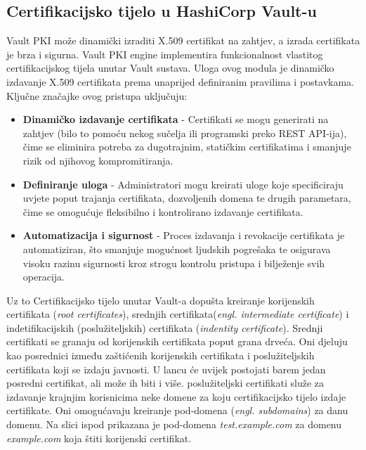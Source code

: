 \documentclass[]{foi}
\begin{document}
\subsection{Certifikacijsko tijelo u HashiCorp Vault-u}

Vault PKI može dinamički izraditi X.509 certifikat na zahtjev, a izrada certifikata je brza i sigurna. \cite{hashicorp-vault-pki-engine} Vault PKI engine implementira funkcionalnost vlastitog certifikacijskog tijela unutar Vault sustava. Uloga ovog modula je dinamičko izdavanje X.509 certifikata prema unaprijed definiranim pravilima i postavkama. Ključne značajke ovog pristupa uključuju:

\begin{itemize}
    \item \textbf{Dinamičko izdavanje certifikata} - Certifikati se mogu generirati na zahtjev (bilo to pomoću nekog sučelja ili programski preko REST API-ija), čime se eliminira potreba za dugotrajnim, statičkim certifikatima i smanjuje rizik od njihovog kompromitiranja.
    \item \textbf{Definiranje uloga} - Administratori mogu kreirati uloge koje specificiraju uvjete poput trajanja certifikata, dozvoljenih domena te drugih parametara, čime se omogućuje fleksibilno i kontrolirano izdavanje certifikata.
    \item \textbf{Automatizacija i sigurnost} - Proces izdavanja i revokacije certifikata je automatiziran, što smanjuje mogućnost ljudskih pogrešaka te osigurava visoku razinu sigurnosti kroz strogu kontrolu pristupa i bilježenje svih operacija.
\end{itemize}

Uz to Certifikacijsko tijelo unutar Vault-a dopušta kreiranje korijenskih certifikata (\textit{root certificates}), srednjih certifikata(\textit{engl. intermediate certificate}) i indetifikacijskih (poslužiteljskih) certifikata (\textit{indentity certificate}). Srednji certifikati se granaju od korijenskih certifikata poput grana drveća. Oni djeluju kao posrednici između zaštićenih korijenskih certifikata i poslužiteljskih certifikata koji se izdaju javnosti. U lancu će uvijek postojati barem jedan posredni certifikat, ali može ih biti i više. poslužiteljski certifikati služe za izdavanje krajnjim korisnicima neke domene za koju certifikacijsko tijelo izdaje certifikate. Oni omogućavaju kreiranje pod-domena (\textit{engl. subdomains}) za danu domenu. Na slici ispod prikazana je pod-domena \textit{test.example.com} za domenu \textit{example.com} koja štiti korijenski certifikat.
\end{document}
